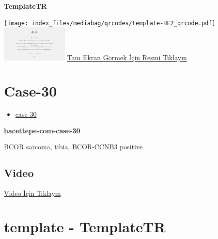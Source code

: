 \documentclass[
  letterpaper,
  DIV=11,
  numbers=noendperiod]{scrreprt}
\providecommand{\tightlist}{%
  \setlength{\itemsep}{0pt}\setlength{\parskip}{0pt}}\usepackage{longtable,booktabs,array}
\begin{document}
\textbf{TemplateTR}

\texttt{[image: index\_files/mediabag/qrcodes/template-HE2\_qrcode.pdf]}
\href{https://images.patolojiatlasi.com/template/HE2.html}{\includegraphics[width=0.25\textwidth,height=\textheight]{./screenshots/thumbnail_template-HE2.png}}
\href{https://images.patolojiatlasi.com/template/HE2.html}{Tam Ekran
Görmek İçin Resmi Tıklayın}

\hypertarget{sec-hacettepe-case-of-the-month-case-30}{%
\section{Case-30}\label{sec-hacettepe-case-of-the-month-case-30}}

\begin{itemize}
\tightlist
\item
  \href{https://www.youtube.com/watch?v=az6Fk7bYsQ8&ab_channel=KemalKosemehmetoglu}{case
  30}
\end{itemize}

\textbf{hacettepe-com-case-30}

\begin{tcolorbox}[enhanced jigsaw, breakable, opacitybacktitle=0.6, arc=.35mm, colbacktitle=quarto-callout-tip-color!10!white, colback=white, toptitle=1mm, left=2mm, opacityback=0, colframe=quarto-callout-tip-color-frame, titlerule=0mm, rightrule=.15mm, bottomrule=.15mm, toprule=.15mm, bottomtitle=1mm, title=\textcolor{quarto-callout-tip-color}{\faLightbulb}\hspace{0.5em}{Tanı}, coltitle=black, leftrule=.75mm]

BCOR sarcoma, tibia, BCOR-CCNB3 positive

\end{tcolorbox}

\hypertarget{video-29}{%
\subsection{Video}\label{video-29}}

\href{https://www.youtube.com/watch?v=az6Fk7bYsQ8}{Video İçin Tıklayın}

\hypertarget{sec-template}{%
\section{template - TemplateTR}\label{sec-template}}
\end{document}
